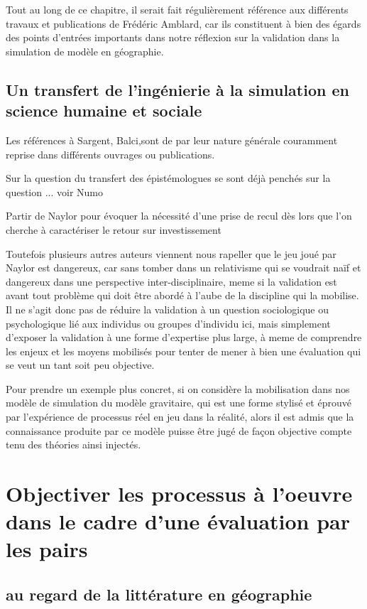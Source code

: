 Tout au long de ce chapitre, il serait fait régulièrement référence aux différents travaux et publications de Frédéric Amblard, car ils constituent à bien des égards des points d'entrées importants dans notre réflexion sur la validation dans la simulation de modèle en géographie.

\subsection{Un transfert de l'ingénierie à la simulation en science humaine et sociale}

Les références à Sargent, Balci,sont de par leur nature générale couramment reprise dans différents ouvrages ou publications.

Sur la question du transfert des épistémologues se sont déjà penchés sur la question ... voir Numo

Partir de Naylor pour évoquer la nécessité d'une prise de recul dès lors que l'on cherche à caractériser le retour sur investissement

Toutefois plusieurs autres auteurs viennent nous rapeller que le jeu joué par Naylor est dangereux, car sans tomber dans un relativisme qui se voudrait naïf et dangereux dans une perspective inter-disciplinaire, meme si la validation est avant tout problème qui doit être abordé à l'aube de la discipline qui la mobilise. Il ne s'agit donc pas de réduire la validation à un question sociologique ou psychologique lié aux individus ou groupes d'individu ici, mais simplement d'exposer la validation à une forme d'expertise plus large, à meme de comprendre les enjeux et les moyens mobilisés pour tenter de mener à bien une évaluation qui se veut un tant soit peu objective.

Pour prendre un exemple plus concret, si on considère la mobilisation dans nos modèle de simulation du  modèle gravitaire, qui est une forme stylisé et éprouvé par l'expérience de processus réel en jeu dans la réalité, alors il est admis que la connaissance produite par ce modèle puisse être jugé de façon objective compte tenu des théories ainsi injectés.


\section{Objectiver les processus à l'oeuvre dans le cadre d'une évaluation par les pairs}

\subsection{au regard de la littérature en géographie}

